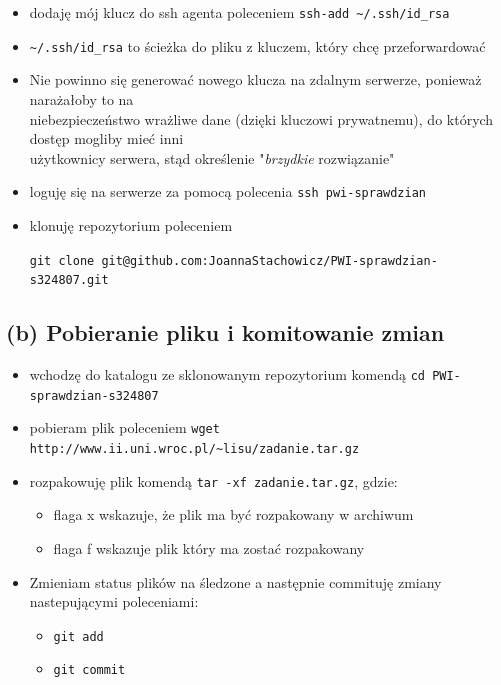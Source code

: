 \documentclass[a4paper, 11pt]{article}
\begin{document}
\begin{itemize}
\item dodaję mój klucz do ssh agenta poleceniem \verb+ssh-add ~/.ssh/id_rsa+
\item \verb+~/.ssh/id_rsa+ to ścieżka do pliku z kluczem, który chcę przeforwardować
\item Nie powinno się generować nowego klucza na zdalnym serwerze, ponieważ narażałoby to na\\ niebezpieczeństwo 
wrażliwe dane (dzięki kluczowi prywatnemu), do których dostęp mogliby mieć inni\\ użytkownicy serwera, 
stąd określenie "\emph{brzydkie} rozwiązanie"
\item loguję się na serwerze za pomocą polecenia \verb+ssh pwi-sprawdzian+
\item klonuję repozytorium poleceniem

\verb+git clone git@github.com:JoannaStachowicz/PWI-sprawdzian-s324807.git+
\end{itemize}

\subsection*{(b) Pobieranie pliku i komitowanie zmian}
\begin{itemize}
\item wchodzę do katalogu ze sklonowanym repozytorium komendą \verb+cd PWI-sprawdzian-s324807+
\item pobieram plik poleceniem \verb+wget http://www.ii.uni.wroc.pl/~lisu/zadanie.tar.gz+
\item rozpakowuję plik komendą \verb+tar -xf zadanie.tar.gz+, gdzie:
\begin{itemize}
\item flaga \textsf{x} wskazuje, że plik ma być rozpakowany w archiwum
\item flaga \textsf{f} wskazuje plik który ma zostać rozpakowany 
\end{itemize}
\item Zmieniam status plików na śledzone a następnie commituję zmiany nastepującymi poleceniami:
\begin{itemize}
\item \verb+git add+
\item \verb+git commit+
\end{itemize}
\end{itemize}
\end{document}
